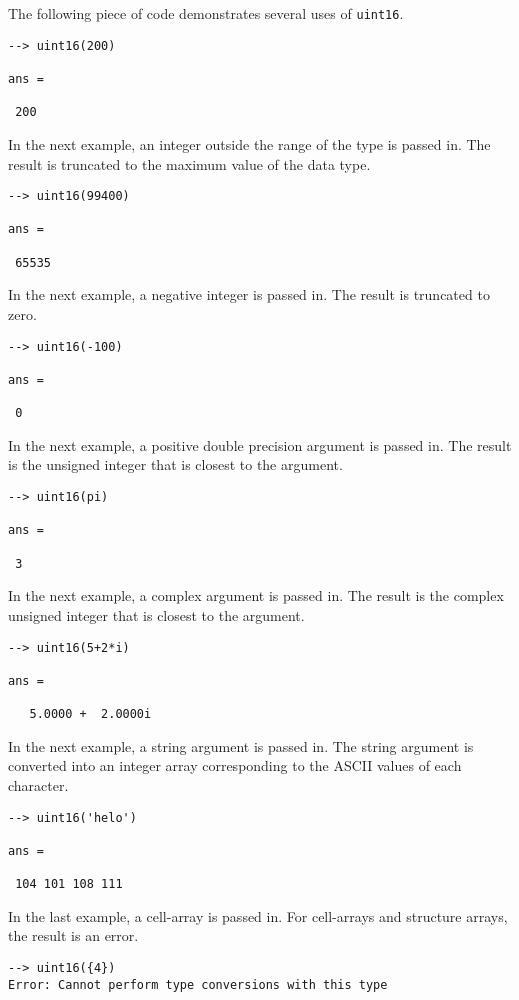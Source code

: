The following piece of code demonstrates several uses of \verb|uint16|.
\begin{verbatim}
--> uint16(200)

ans = 

 200 
\end{verbatim}
In the next example, an integer outside the range  of the type is passed in.  
The result is truncated to the maximum value of the data type.
\begin{verbatim}
--> uint16(99400)

ans = 

 65535 
\end{verbatim}
In the next example, a negative integer is passed in.  The result is 
truncated to zero.
\begin{verbatim}
--> uint16(-100)

ans = 

 0 
\end{verbatim}
In the next example, a positive double precision argument is passed in.  
The result is the unsigned integer that is closest to the argument.
\begin{verbatim}
--> uint16(pi)

ans = 

 3 
\end{verbatim}
In the next example, a complex argument is passed in.  The result is the 
complex unsigned integer that is closest to the argument.
\begin{verbatim}
--> uint16(5+2*i)

ans = 

   5.0000 +  2.0000i 
\end{verbatim}
In the next example, a string argument is passed in.  The string argument is converted into an integer array corresponding to the ASCII values of each character.
\begin{verbatim}
--> uint16('helo')

ans = 

 104 101 108 111 
\end{verbatim}
In the last example, a cell-array is passed in.  For cell-arrays and structure arrays, the result is an error.
\begin{verbatim}
--> uint16({4})
Error: Cannot perform type conversions with this type
\end{verbatim}
